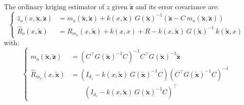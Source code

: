 \begin{proposition}\label{th:ordinary_kriging}
	The ordinary kriging estimator of $z$ given $\tilde{\mathbf{z}}$ and its error covariance are:
	\begin{equation}
		\left\{\begin{aligned}
		\hat{z}_o(x,\tilde{\mathbf{x}},\tilde{\mathbf{z}})&=m_o(\tilde{\mathbf{x}},\tilde{\mathbf{z}})+k(x,\tilde{\mathbf{x}})\:G(\tilde{\mathbf{x}})^{-1}\left(\tilde{\mathbf{z}}-C\:m_o(\tilde{\mathbf{x}},\tilde{\mathbf{z}})\right)\\
		\hat{R}_o(x,\tilde{\mathbf{x}})&=\hat{R}_{m_o}(x,\tilde{\mathbf{x}})+k(x,x)+R-k(x,\tilde{\mathbf{x}})\:G(\tilde{\mathbf{x}})^{-1}\:k\left(\tilde{\mathbf{x}},x\right)
		\end{aligned}\right.\label{eq:ordinary_kriging_equations}
	\end{equation}
	with:
	\begin{equation}
		\left\{\begin{aligned}
		m_o(\tilde{\mathbf{x}},\tilde{\mathbf{z}})&=\left(C^\top G(\tilde{\mathbf{x}})^{-1}C\right)^{-1}C^\top G(\tilde{\mathbf{x}})^{-1}\tilde{\mathbf{z}}\\
		\hat{R}_{m_o}(x,\tilde{\mathbf{x}})&=\left(I_{d_z}-k(x,\tilde{\mathbf{x}})\:G(\tilde{\mathbf{x}})^{-1}C\right)\left(C^\top G(\tilde{\mathbf{x}})^{-1}C\right)^{-1}\\
		&\qquad\left(I_{d_z}-k(x,\tilde{\mathbf{x}})\:G(\tilde{\mathbf{x}})^{-1}C\right)^\top
		\end{aligned}\right.\label{eq:kriged_ordinary_mean}
	\end{equation}
\end{proposition}

